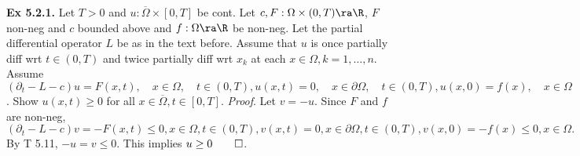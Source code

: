 {\bf Ex 5.2.1.} Let $T>0$ and $u: \overline{\Omega}\times [0,T]$ be cont.  Let $c, F : \Omega \times (0,T) \ra \R$, $F$ non-neg and $c$ bounded above and $f:\Omega\ra \R$ be non-neg.  Let the partial differential operator $L$ be as in the text before.  Assume that $u$ is once partially diff wrt $t \in (0,T)$ and twice partially diff wrt $x_k$ at each $x \in \Omega, k=1,\dots, n$. Assume $(\partial_t-L-c)u = F(x,t), \quad x \in \Omega, \quad t \in (0,T), u(x,t)=0, \quad x \in \partial \Omega, \quad t \in (0,T), u(x,0)=f(x), \quad x \in \Omega$. Show $u(x,t)\geq 0$ for all $x \in \overline{\Omega}, t \in [0,T]$. {\it Proof}. Let $v=-u$. Since $F$ and $f$ are non-neg, $(\partial_t-L-c)v = -F(x,t) \leq 0, x \in \Omega, t \in (0,T), v(x,t) = 0,  x \in \partial \Omega, t \in (0,T), v(x,0)=-f(x) \leq 0, x \in \Omega.$ By T 5.11, $-u = v \leq 0$. This implies $u \geq 0\qed$.